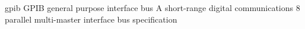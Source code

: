 \newglsXacronym%
{gpib}%
{GPIB}%
{general purpose interface bus}%
{A short{\--}range digital communications \SI{8}{\bit} parallel multi-master interface bus specification}%